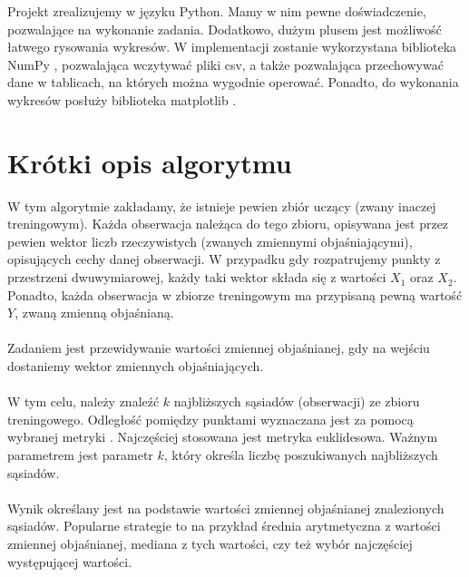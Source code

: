 \documentclass[10pt,a4paper]{article}
\begin{document}
Projekt zrealizujemy w języku Python. Mamy w nim pewne doświadczenie, pozwalające na wykonanie zadania. Dodatkowo, dużym plusem jest możliwość łatwego rysowania wykresów. W implementacji zostanie wykorzystana biblioteka NumPy \cite{numpy}, pozwalająca wczytywać pliki csv, a także pozwalająca przechowywać dane w tablicach, na których można wygodnie operować. Ponadto, do wykonania wykresów posłuży biblioteka matplotlib \cite{matplot}.

\section{Krótki opis algorytmu}

W tym algorytmie zakładamy, że istnieje pewien zbiór uczący (zwany inaczej treningowym). Każda obserwacja należąca do tego zbioru, opisywana jest przez pewien wektor liczb rzeczywistych (zwanych zmiennymi objaśniającymi), opisujących cechy danej obserwacji. W przypadku gdy rozpatrujemy punkty z przestrzeni dwuwymiarowej, każdy taki wektor składa się z wartości $X_1$ oraz $X_2$. Ponadto, każda obserwacja w zbiorze treningowym ma przypisaną pewną wartość $Y$, zwaną zmienną objaśnianą\cite{python-ds-essentials}. 
\\~\\
Zadaniem jest przewidywanie wartości zmiennej objaśnianej, gdy na wejściu dostaniemy wektor zmiennych objaśniających\cite{python-ds-essentials}. 
\\~\\
W tym celu, należy znaleźć $k$ najbliższych sąsiadów (obserwacji) ze zbioru treningowego. Odległość pomiędzy punktami wyznaczana jest za pomocą wybranej metryki \cite{complete-guide-knn}. Najczęściej stosowana jest metryka euklidesowa. Ważnym parametrem jest parametr $k$, który określa liczbę poszukiwanych najbliższych sąsiadów. 
\\~\\
Wynik określany jest na podstawie wartości zmiennej objaśnianej znalezionych sąsiadów. Popularne strategie to na przykład średnia arytmetyczna z wartości zmiennej objaśnianej, mediana z tych wartości, czy też wybór najczęściej występującej wartości\cite{complete-guide-knn}.

\renewcommand{\refname}{\normalfont\selectfont\normalsize} 
\end{document}

